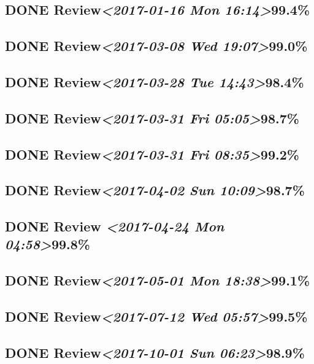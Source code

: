 \documentclass[11pt]{ctexart}
\begin{document}
\subsection{{\bfseries\sffamily DONE} Review\textit{<2017-01-16 Mon 16:14>}99.4\%}
\label{sec:org3b95c8a}
\subsection{{\bfseries\sffamily DONE} Review\textit{<2017-03-08 Wed 19:07>}99.0\%}
\label{sec:orgd1f3a3e}
\subsection{{\bfseries\sffamily DONE} Review\textit{<2017-03-28 Tue 14:43>}98.4\%}
\label{sec:org001b168}
\subsection{{\bfseries\sffamily DONE} Review\textit{<2017-03-31 Fri 05:05>}98.7\%}
\label{sec:orgb1094d2}
\subsection{{\bfseries\sffamily DONE} Review\textit{<2017-03-31 Fri 08:35>}99.2\%}
\label{sec:org30d2702}
\subsection{{\bfseries\sffamily DONE} Review\textit{<2017-04-02 Sun 10:09>}98.7\%}
\label{sec:org6df6b4e}
\subsection{{\bfseries\sffamily DONE} Review \textit{<2017-04-24 Mon 04:58>}99.8\%}
\label{sec:org6b31ed5}
\subsection{{\bfseries\sffamily DONE} Review\textit{<2017-05-01 Mon 18:38>}99.1\%}
\label{sec:org3739533}
\subsection{{\bfseries\sffamily DONE} Review\textit{<2017-07-12 Wed 05:57>}99.5\%}
\label{sec:org2d34ea6}
\subsection{{\bfseries\sffamily DONE} Review\textit{<2017-10-01 Sun 06:23>}98.9\%}
\label{sec:org9a0deb9}
\end{document}
